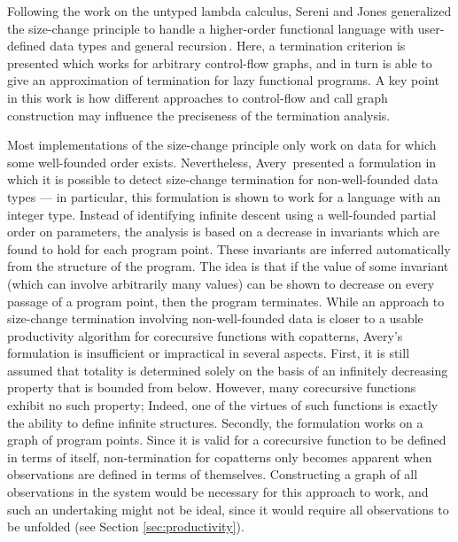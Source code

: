 Following the work on the untyped lambda calculus, Sereni and Jones generalized the size-change principle to handle a higher-order functional language with user-defined data types and general recursion\,\citep{Sereni05terminationanalysis,Sereni06Phd}. Here, a termination criterion is presented which works for arbitrary control-flow graphs, and in turn is able to give an approximation of termination for lazy functional programs. A key point in this work is how different approaches to control-flow and call graph construction may influence the preciseness of the termination analysis.

Most implementations of the size-change principle only work on data for which some well-founded order exists. Nevertheless, Avery\,\citep{Avery06} presented a formulation in which it is possible to detect size-change termination for non-well-founded data types --- in particular, this formulation is shown to work for a language with an integer type. Instead of identifying infinite descent using a well-founded partial order on parameters, the analysis is based on a decrease in invariants which are found to hold for each program point. These invariants are inferred automatically from the structure of the program. The idea is that if the value of some invariant (which can involve arbitrarily many values) can be shown to decrease on every passage of a program point, then the program terminates. While an approach to size-change termination involving non-well-founded data is closer to a usable productivity algorithm for corecursive functions with copatterns, Avery's formulation is insufficient or impractical in several aspects. First, it is still assumed that totality is determined solely on the basis of an infinitely decreasing property that is bounded from below. However, many corecursive functions exhibit no such property; Indeed, one of the virtues of such functions is exactly the ability to define infinite structures. Secondly, the formulation works on a graph of program points. Since it is valid for a corecursive function to be defined in terms of itself, non-termination for copatterns only becomes apparent when observations are defined in terms of themselves. Constructing a graph of all observations in the system would be necessary for this approach to work, and such an undertaking might not be ideal, since it would require all observations to be unfolded (see Section \ref{sec:productivity}).

